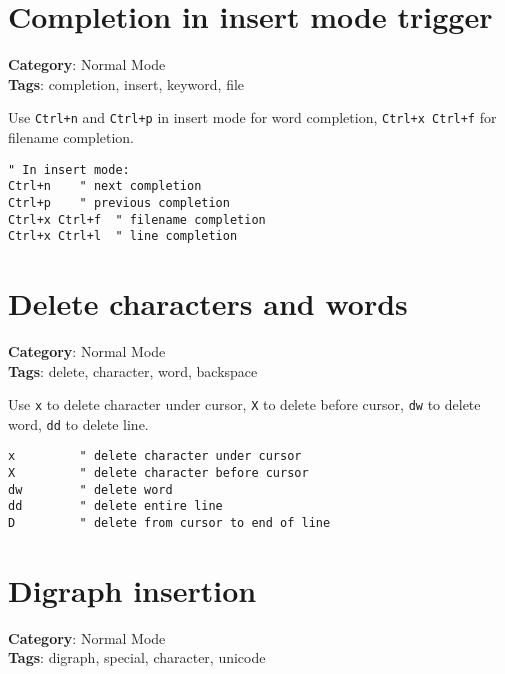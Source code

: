 {{{{{{{{{\section{Completion in insert mode trigger}

\textbf{Category}: Normal Mode\\ \textbf{Tags}: completion, insert, keyword, file
\vspace{0.5cm}

Use {\footnotesize \Verb§Ctrl+n§} and {\footnotesize \Verb§Ctrl+p§} in insert mode for word completion, {\footnotesize \Verb§Ctrl+x Ctrl+f§} for filename completion.

\begin{Exa*}{}
\begin{Verbatim}[fontsize=\footnotesize, breaklines, breakanywhere]
" In insert mode:
Ctrl+n    " next completion
Ctrl+p    " previous completion
Ctrl+x Ctrl+f  " filename completion
Ctrl+x Ctrl+l  " line completion
\end{Verbatim}
\end{Exa*}

\section{Delete characters and words}

\textbf{Category}: Normal Mode\\ \textbf{Tags}: delete, character, word, backspace
\vspace{0.5cm}

Use {\footnotesize \Verb§x§} to delete character under cursor, {\footnotesize \Verb§X§} to delete before cursor, {\footnotesize \Verb§dw§} to delete word, {\footnotesize \Verb§dd§} to delete line.

\begin{Exa*}{}
\begin{Verbatim}[fontsize=\footnotesize, breaklines, breakanywhere]
x         " delete character under cursor
X         " delete character before cursor
dw        " delete word
dd        " delete entire line
D         " delete from cursor to end of line
\end{Verbatim}
\end{Exa*}

\section{Digraph insertion}

\textbf{Category}: Normal Mode\\ \textbf{Tags}: digraph, special, character, unicode
\vspace{0.5cm}

}}}}}}}}}
